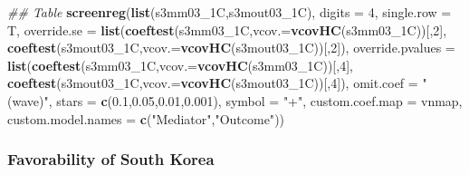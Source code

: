 \documentclass[
]{article}
\newenvironment{Shaded}{\begin{snugshade}}{\end{snugshade}}
\newcommand{\CommentTok}[1]{\textcolor[rgb]{0.56,0.35,0.01}{\textit{#1}}}
\newcommand{\DataTypeTok}[1]{\textcolor[rgb]{0.13,0.29,0.53}{#1}}
\newcommand{\DecValTok}[1]{\textcolor[rgb]{0.00,0.00,0.81}{#1}}
\newcommand{\FloatTok}[1]{\textcolor[rgb]{0.00,0.00,0.81}{#1}}
\newcommand{\KeywordTok}[1]{\textcolor[rgb]{0.13,0.29,0.53}{\textbf{#1}}}
\newcommand{\NormalTok}[1]{#1}
\newcommand{\StringTok}[1]{\textcolor[rgb]{0.31,0.60,0.02}{#1}}
\begin{document}
\begin{Shaded}
\begin{Highlighting}[]
\CommentTok{## Table}
\KeywordTok{screenreg}\NormalTok{(}\KeywordTok{list}\NormalTok{(s3mm03_1C,s3mout03_1C), }\DataTypeTok{digits =} \DecValTok{4}\NormalTok{, }\DataTypeTok{single.row =}\NormalTok{ T,}
          \DataTypeTok{override.se =} \KeywordTok{list}\NormalTok{(}\KeywordTok{coeftest}\NormalTok{(s3mm03_1C,}\DataTypeTok{vcov.=}\KeywordTok{vcovHC}\NormalTok{(s3mm03_1C))[,}\DecValTok{2}\NormalTok{],}
                             \KeywordTok{coeftest}\NormalTok{(s3mout03_1C,}\DataTypeTok{vcov.=}\KeywordTok{vcovHC}\NormalTok{(s3mout03_1C))[,}\DecValTok{2}\NormalTok{]),}
          \DataTypeTok{override.pvalues =} \KeywordTok{list}\NormalTok{(}\KeywordTok{coeftest}\NormalTok{(s3mm03_1C,}\DataTypeTok{vcov.=}\KeywordTok{vcovHC}\NormalTok{(s3mm03_1C))[,}\DecValTok{4}\NormalTok{],}
                                  \KeywordTok{coeftest}\NormalTok{(s3mout03_1C,}\DataTypeTok{vcov.=}\KeywordTok{vcovHC}\NormalTok{(s3mout03_1C))[,}\DecValTok{4}\NormalTok{]),}
          \DataTypeTok{omit.coef =} \StringTok{"(wave)"}\NormalTok{, }\DataTypeTok{stars =} \KeywordTok{c}\NormalTok{(}\FloatTok{0.1}\NormalTok{,}\FloatTok{0.05}\NormalTok{,}\FloatTok{0.01}\NormalTok{,}\FloatTok{0.001}\NormalTok{), }\DataTypeTok{symbol =} \StringTok{"+"}\NormalTok{,}
          \DataTypeTok{custom.coef.map =}\NormalTok{ vnmap, }
          \DataTypeTok{custom.model.names =} \KeywordTok{c}\NormalTok{(}\StringTok{"Mediator"}\NormalTok{,}\StringTok{"Outcome"}\NormalTok{))}
\end{Highlighting}
\end{Shaded}

\hypertarget{favorability-of-south-korea}{%
\subsubsection{Favorability of South
Korea}\label{favorability-of-south-korea}}
\end{document}
